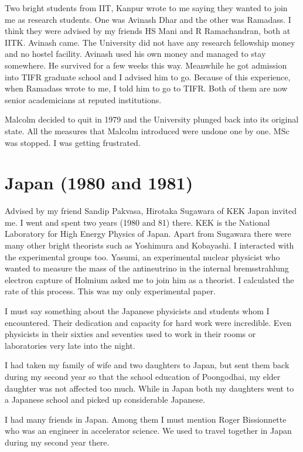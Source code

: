 Two bright students from IIT, Kanpur wrote to me saying they wanted to 
join me as research students. One was Avinash Dhar and the other was 
Ramadass. I think they were advised by my friends HS Mani and R 
Ramachandran, both at IITK. Avinash came. The University did not have 
any research fellowship money and no hostel facility. Avinash used his 
own money and managed to stay somewhere. He survived for a few weeks 
this way. Meanwhile he got admission into TIFR graduate school and I 
advised him to go. Because of this experience, when Ramadass wrote to 
me, I told him to go to TIFR. Both of them are now senior academicians 
at reputed institutions.

Malcolm decided to quit in 1979 and the University plunged back into its 
original state. All the measures that Malcolm introduced were undone one 
by one. MSc was stopped. I was getting frustrated.

\section*{Japan (1980 and 1981)}

Advised by my friend Sandip Pakvasa, Hirotaka Sugawara of KEK Japan 
invited me. I went and spent two years (1980 and 81) there. KEK is the 
National Laboratory for High Energy Physics of Japan. Apart from 
Sugawara there were many other bright theorists such as Yoshimura and 
Kobayashi. I interacted with the experimental groups too. Yasumi, an 
experimental nuclear physicist who wanted to measure the mass of the 
antineutrino in the internal bremsstrahlung electron capture of Holmium 
asked me to join him as a theorist. I calculated the rate of this 
process. This was my only experimental paper.
\smallskip

I must say something about the Japanese physicists and students whom I 
encountered. Their dedication and capacity for hard work were 
incredible. Even physicists in their sixties and seventies used to work 
in their rooms or laboratories very late into the night.
\smallskip

I had taken my family of wife and two daughters to Japan, but sent them 
back during my second year so that the school education of Poongodhai, my 
elder daughter was not affected too much. While in Japan both my 
daughters went to a Japanese school and picked up considerable Japanese.
\smallskip

I had many friends in Japan. Among them I must mention Roger 
Bissionnette who was an engineer in accelerator science. We used to 
travel together in Japan during my second year there.
\smallskip

